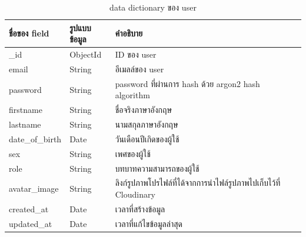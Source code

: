 \documentclass[12pt,oneside,openright,a4paper]{cpe-thai-project}
\begin{document}
\begin{table}[!h]
  \caption{data dictionary ของ user}\label{tbl:er-table1}
  \begin{tabular}{|p{2.5cm}|p{2cm}|p{10cm}|}
    \hline
    \textbf{ชื่อของ field} & \textbf{รูปแบบข้อมูล} & \textbf{คำอธิบาย}                                     \\
    \hline
    \_id                 & ObjectId           & ID ของ user                                         \\
    \hline
    email                & String             & อีเมลล์ของ user                                       \\
    \hline
    password             & String             & password ที่ผ่านการ hash ด้วย argon2 hash algorithm     \\
    \hline
    firstname            & String             & ชื่อจริงภาษาอังกฤษ                                      \\
    \hline
    lastname             & String             & นามสกุลภาษาอังกฤษ                                     \\
    \hline
    date\_of\_birth      & Date               & วันเดือนปีเกิดของผู้ใช้                                    \\
    \hline
    sex                  & String             & เพศของผู้ใช้                                           \\
    \hline
    role                 & String             & บทบาทความสามารถของผู้ใช้                               \\
    \hline
    avatar\_image        & String             & ลิงก์รูปภาพโปรไฟล์ที่ได้จากการนำไฟล์รูปภาพไปเก็บไว้ที่ Cloudinary \\
    \hline
    created\_at          & Date               & เวลาที่สร้างข้อมูล                                       \\
    \hline
    updated\_at          & Date               & เวลาที่แก้ไขข้อมูลล่าสุด                                   \\
    \hline
  \end{tabular}
\end{table}
\end{document}
